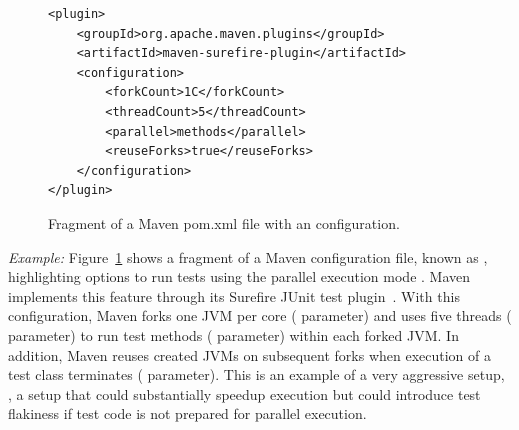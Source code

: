 \documentclass[10pt,journal,compsoc]{IEEEtran}
\begin{document}
\begin{figure}[h!]
\centering
\scriptsize
{}
\vspace{-4ex}
\begin{lstlisting}
<plugin>
    <groupId>org.apache.maven.plugins</groupId>
    <artifactId>maven-surefire-plugin</artifactId>
    <configuration>
        <forkCount>1C</forkCount>
        <threadCount>5</threadCount>    
        <parallel>methods</parallel>
        <reuseForks>true</reuseForks>        
    </configuration>
</plugin>
\end{lstlisting}
  \vspace{-4ex}
  \caption{\label{fig:surefire} Fragment of a Maven pom.xml file with
    an \ForkParMeth{} configuration.}
\end{figure}


\noindent\emph{Example:} Figure~\ref{fig:surefire} shows a
fragment of a Maven configuration file, known as \pomf{}, highlighting
options to run tests using the parallel execution mode \ForkParMeth{}.
Maven implements this feature through its Surefire JUnit test
plugin~\cite{maven-surefire-plugin}.  With this configuration, Maven
forks one JVM per core ( parameter) and uses five
threads ( parameter) to run test methods
( parameter) within each forked JVM. In addition, Maven reuses
created JVMs on subsequent forks when execution of a test class
terminates ( parameter). This is an example of a
very aggressive setup, \ie{}, a setup that could substantially speedup
execution but could introduce test flakiness if test code is not
prepared for parallel execution.
\end{document}
